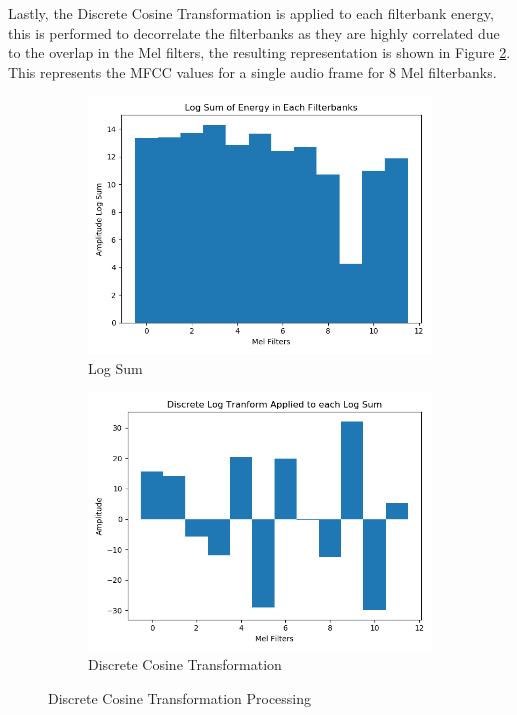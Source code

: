 Lastly, the Discrete Cosine Transformation is applied to each filterbank energy, this is performed to decorrelate the filterbanks as they are highly correlated due to the overlap in the Mel filters, the resulting representation is shown in Figure \ref{fig:mfcc_dct}.
This represents the MFCC values for a single audio frame for 8 Mel filterbanks.

\begin{figure}[h!]
    \centering
    \begin{subfigure}[b]{0.49\textwidth}
        \includegraphics[width=\textwidth]{figures/mfcc/filterbank_log_sum.png}
        \caption{Log Sum}\label{fig:mfcc_log_sum}
    \end{subfigure}
    \begin{subfigure}[b]{0.49\textwidth}
        \includegraphics[width=\textwidth]{figures/mfcc/dct_applied.png}
        \caption{Discrete Cosine Transformation}\label{fig:mfcc_dct}
    \end{subfigure}
    \caption{Discrete Cosine Transformation Processing}\label{fig:mfcc_filterbank_processing}
\end{figure}

